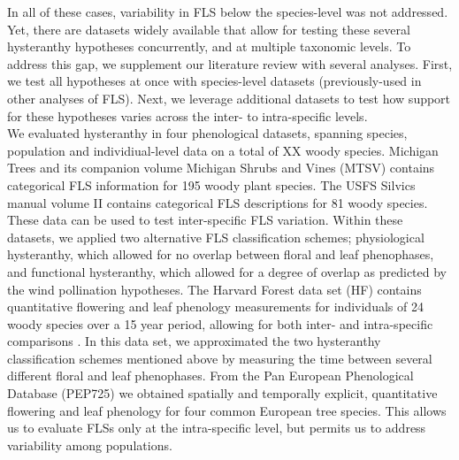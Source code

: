 \documentclass[12pt]{article}\usepackage[]{graphicx}\usepackage[]{color}
\begin{document}
\indent In all of these cases, variability in FLS below the species-level was not addressed. Yet, there are datasets widely available that allow for testing these several hysteranthy hypotheses concurrently, and at multiple taxonomic levels. To address this gap, we supplement our literature review with several analyses. First, we test all hypotheses at once with species-level datasets (previously-used in other analyses of FLS). Next, we leverage additional datasets to test how support for these hypotheses varies across the inter- to intra-specific levels.\\ 

\indent We evaluated hysteranthy in four phenological datasets, spanning species, population and individiual-level data on a total of XX woody species. Michigan Trees and its companion volume Michigan Shrubs and Vines \citep{Barnes2004,Barnes2016} (MTSV) contains categorical FLS information for 195 woody plant species. The USFS Silvics manual volume II \citep{Burns1990} contains categorical FLS descriptions for 81 woody species. These data can be used to test inter-specific FLS variation. Within these datasets, we applied two alternative FLS classification schemes; physiological hysteranthy, which allowed for no overlap between floral and leaf phenophases, and functional hysteranthy, which allowed for a degree of overlap as predicted by the wind pollination hypotheses. The Harvard Forest data set (HF) contains quantitative flowering and leaf phenology measurements for individuals of 24 woody species over a 15 year period, allowing for both inter- and intra-specific comparisons \citep{OKeefe2015}. In this data set, we approximated the two hysteranthy classification schemes mentioned above by measuring the time between several different floral and leaf phenophases. From the Pan European Phenological Database (PEP725) \citep{PEP725} we obtained spatially and temporally explicit, quantitative flowering and leaf phenology for four common European tree species. This allows us to evaluate FLSs only at the intra-specific level, but permits us to address variability among populations.\\
\end{document}
